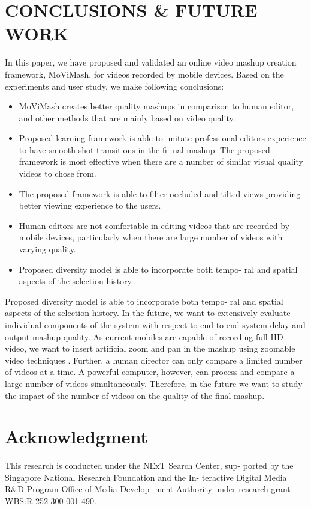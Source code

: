 \documentclass{sig-alternate}
\begin{document}
\section{CONCLUSIONS \& FUTURE WORK}
In this paper, we have proposed and validated an online video
mashup creation framework, MoViMash, for videos recorded by
mobile devices. Based on the experiments and user study, we make
following conclusions:
\begin{itemize}
    \item MoViMash creates better quality mashups in comparison to
human editor, and other methods that are mainly based on
video quality.
    \item Proposed learning framework is able to imitate professional
editor\textquotesingle s experience to have smooth shot transitions in the fi-
nal mashup. The proposed framework is most effective when there are a number of similar visual quality videos to chose
from.
    \item The proposed framework is able to filter occluded and tilted
views providing better viewing experience to the users.
    \item Human editors are not comfortable in editing videos that are
recorded by mobile devices, particularly when there are large
number of videos with varying quality.
    \item Proposed diversity model is able to incorporate both tempo-
ral and spatial aspects of the selection history.
\end{itemize}

Proposed diversity model is able to incorporate both tempo-
ral and spatial aspects of the selection history. In the future, we want to extensively evaluate individual components of the system with respect to end-to-end system delay and output mashup quality. As current mobiles are capable of recording full HD video, we want to insert artificial zoom and pan in the mashup using zoomable video techniques \cite{web:11}. Further, a human director can only compare a limited number of videos at a time.
A powerful computer, however, can process and compare a large number of videos simultaneously. Therefore, in the future we want to study the impact of the number of videos on the quality of the final mashup.

\section*{Acknowledgment}
This research is conducted under the NExT Search Center, sup-
ported by the Singapore National Research Foundation and the In-
teractive Digital Media R\&D Program Office of Media Develop-
ment Authority under research grant WBS:R-252-300-001-490.

\printbibliography
%
%
\end{document}
